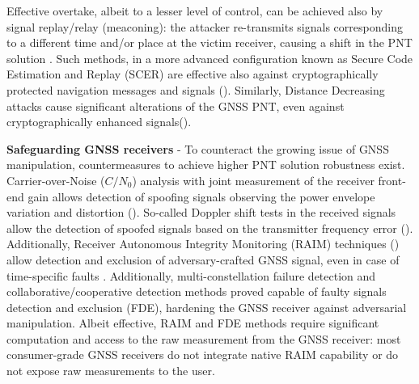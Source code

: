 Effective overtake, albeit to a lesser level of control, can be achieved also by signal replay/relay (meaconing): the attacker re-transmits signals corresponding to a different time and/or place at the victim receiver, causing a shift in the PNT solution \cite{Lenhart2022}. Such methods, in a more advanced configuration known as Secure Code Estimation and Replay (SCER) are effective also against cryptographically protected navigation messages and signals (\cite{humphreys2013detection, Arizabaleta2019, Gallardo2020}). Similarly, Distance Decreasing attacks cause significant alterations of the GNSS PNT, even against cryptographically enhanced signals(\cite{ZhangLP:J:2022, ZhangP:C:2019a}).


\textbf{Safeguarding GNSS receivers} - To counteract the growing issue of GNSS manipulation, countermeasures to achieve higher PNT solution robustness exist. Carrier-over-Noise ($C/N_0$) analysis with joint measurement of the receiver front-end gain allows detection of spoofing signals observing the power envelope variation and distortion (\cite{Akos2012, Lo2019, wesson2017gnss}). So-called Doppler shift tests in the received signals allow the detection of spoofed signals based on the transmitter frequency error (\cite{papadimMilcom2008, psiaki2013antenna}). Additionally, Receiver Autonomous Integrity Monitoring (RAIM) techniques (\cite{Jada2021, Sathaye2020}) allow detection and exclusion of adversary-crafted GNSS signal, even in case of time-specific faults \cite{gioiaTRAIM2021}. Additionally, multi-constellation failure detection \cite{ZhangP:C:2019b} and collaborative/cooperative detection methods proved capable of faulty signals detection and exclusion (FDE), hardening the GNSS receiver against adversarial manipulation. Albeit effective, RAIM and FDE methods require significant computation and access to the raw measurement from the GNSS receiver: most consumer-grade GNSS receivers do not integrate native RAIM capability or do not expose raw measurements to the user.


